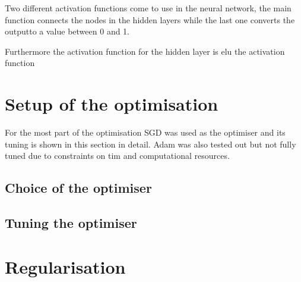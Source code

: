 
Two different activation functions come to use in the neural network, the main function connects the nodes in the hidden layers while the last one converts the outputto a value between \num{0} and \num{1}. 


Furthermore the activation function for the hidden layer is elu
the activation function 

\section{Setup of the optimisation}

For the most part of the optimisation SGD was used as the optimiser and its tuning is shown in this section in detail.
Adam was also tested out but not fully tuned due to constraints on tim and computational resources.

\subsection{Choice of the optimiser}

\subsection{Tuning the optimiser}



\section{Regularisation}